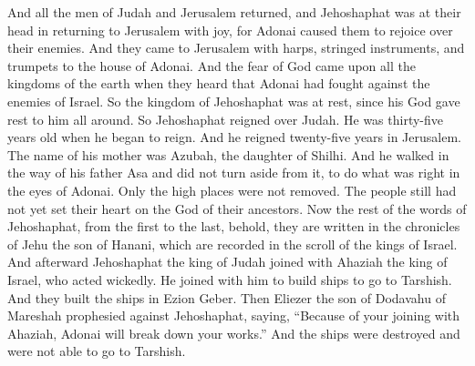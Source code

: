 \begin{biblechapter}
\verse And all the men of Judah and Jerusalem returned, and Jehoshaphat was at their head in returning to Jerusalem with joy, for Adonai caused them to rejoice over their enemies.
\verse And they came to Jerusalem with harps, stringed instruments, and trumpets to the house of Adonai.
\verse And the fear of God came upon all the kingdoms of the earth when they heard that Adonai had fought against the enemies of Israel.
\verse So the kingdom of Jehoshaphat was at rest, since his God gave rest to him all around.
 So Jehoshaphat reigned over Judah. He was thirty-five years old when he began to reign. And he reigned twenty-five years in Jerusalem. The name of his mother was Azubah, the daughter of Shilhi.
\verse And he walked in the way of his father Asa and did not turn aside from it, to do what was right in the eyes of Adonai.
\verse Only the high places were not removed. The people still had not yet set their heart on the God of their ancestors.
\verse Now the rest of the words of Jehoshaphat, from the first to the last, behold, they are written in the chronicles of Jehu the son of Hanani, which are recorded in the scroll of the kings of Israel.
\verse And afterward Jehoshaphat the king of Judah joined with Ahaziah the king of Israel, who acted wickedly.
\verse He joined with him to build ships to go to Tarshish. And they built the ships in Ezion Geber.
\verse Then Eliezer the son of Dodavahu of Mareshah prophesied against Jehoshaphat, saying, “Because of your joining with Ahaziah, Adonai will break down your works.” And the ships were destroyed and were not able to go to Tarshish.
\end{biblechapter}

